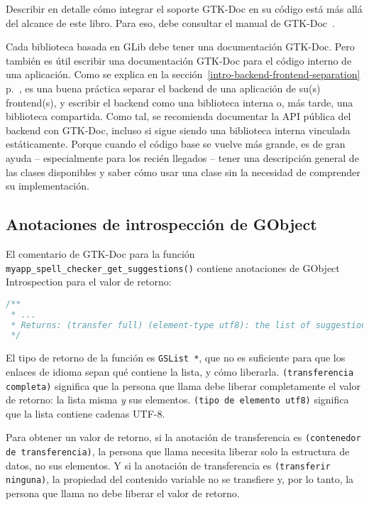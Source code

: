 Describir en detalle cómo integrar el soporte GTK-Doc en su código está más allá del alcance de este libro. Para eso, debe consultar el manual de GTK-Doc~\cite{gtk-doc}.

Cada biblioteca basada en GLib debe tener una documentación GTK-Doc. Pero también es útil escribir una documentación GTK-Doc para el código interno de una aplicación. Como se explica en la sección~\ref{intro-backend-frontend-separation} p.~\pageref{intro-backend-frontend-separation}, es una buena práctica separar el backend de una aplicación de su(s) frontend(s), y escribir el backend como una biblioteca interna o, más tarde, una biblioteca compartida. Como tal, se recomienda documentar la API pública del backend con GTK-Doc, incluso si sigue siendo una biblioteca interna vinculada estáticamente. Porque cuando el código base se vuelve más grande, es de gran ayuda -- especialmente para los recién llegados -- tener una descripción general de las clases disponibles y saber cómo usar una clase sin la necesidad de comprender su implementación.

\subsection{Anotaciones de introspección de GObject}
El comentario de GTK-Doc para la función \lstinline{myapp_spell_checker_get_suggestions()} contiene anotaciones de GObject Introspection para el valor de retorno:

\begin{lstlisting}[language=C]
/**
 * ...
 * Returns: (transfer full) (element-type utf8): the list of suggestions.
 */
\end{lstlisting}

El tipo de retorno de la función es \lstinline{GSList *}, que no es suficiente para que los enlaces de idioma sepan qué contiene la lista, y cómo liberarla. \texttt{(transferencia completa)} significa que la persona que llama debe liberar completamente el valor de retorno: la lista misma \emph{y} sus elementos. \texttt{(tipo de elemento utf8)} significa que la lista contiene cadenas UTF-8.

Para obtener un valor de retorno, si la anotación de transferencia es \texttt{(contenedor de transferencia)}, la persona que llama necesita liberar solo la estructura de datos, no sus elementos. Y si la anotación de transferencia es \texttt{(transferir ninguna)}, la propiedad del contenido variable no se transfiere y, por lo tanto, la persona que llama no debe liberar el valor de retorno.

